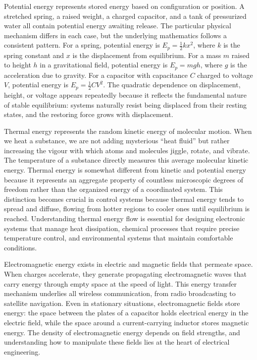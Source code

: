 Potential energy represents stored energy based on configuration or position. A stretched spring, a raised weight, a charged capacitor, and a tank of pressurized water all contain potential energy awaiting release. The particular physical mechanism differs in each case, but the underlying mathematics follows a consistent pattern. For a spring, potential energy is $E_p = \frac{1}{2}kx^2$, where $k$ is the spring constant and $x$ is the displacement from equilibrium. For a mass $m$ raised to height $h$ in a gravitational field, potential energy is $E_p = mgh$, where $g$ is the acceleration due to gravity. For a capacitor with capacitance $C$ charged to voltage $V$, potential energy is $E_p = \frac{1}{2}CV^2$. The quadratic dependence on displacement, height, or voltage appears repeatedly because it reflects the fundamental nature of stable equilibrium: systems naturally resist being displaced from their resting states, and the restoring force grows with displacement.

Thermal energy represents the random kinetic energy of molecular motion. When we heat a substance, we are not adding mysterious ``heat fluid'' but rather increasing the vigour with which atoms and molecules jiggle, rotate, and vibrate. The temperature of a substance directly measures this average molecular kinetic energy. Thermal energy is somewhat different from kinetic and potential energy because it represents an aggregate property of countless microscopic degrees of freedom rather than the organized energy of a coordinated system. This distinction becomes crucial in control systems because thermal energy tends to spread and diffuse, flowing from hotter regions to cooler ones until equilibrium is reached. Understanding thermal energy flow is essential for designing electronic systems that manage heat dissipation, chemical processes that require precise temperature control, and environmental systems that maintain comfortable conditions.

Electromagnetic energy exists in electric and magnetic fields that permeate space. When charges accelerate, they generate propagating electromagnetic waves that carry energy through empty space at the speed of light. This energy transfer mechanism underlies all wireless communication, from radio broadcasting to satellite navigation. Even in stationary situations, electromagnetic fields store energy: the space between the plates of a capacitor holds electrical energy in the electric field, while the space around a current-carrying inductor stores magnetic energy. The density of electromagnetic energy depends on field strengths, and understanding how to manipulate these fields lies at the heart of electrical engineering.

